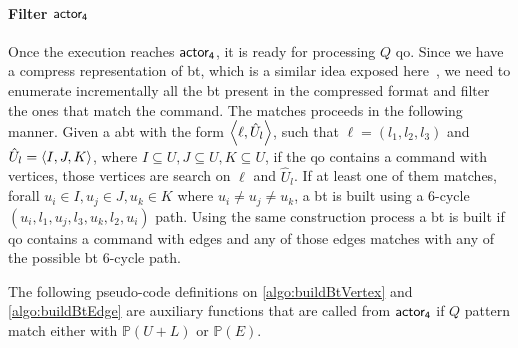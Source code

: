 \paragraph{Filter $\mathsf{actor_4}$} Once the execution reaches $\mathsf{actor_4}$, it is ready for processing $Q$ \acrlong{qo}. 
Since we have a compress representation of \acrshort{bt}, which is a similar idea exposed here~\cite{Lai}, we need to enumerate incrementally all the \acrshort{bt} present in the compressed format and filter the ones that match the command.
The matches proceeds in the following manner. Given a \acrshort{abt} with the form $\left\langle \ell, \hat{U}_l \right\rangle$, such that $\ell = (l_1,l_2,l_3)$ and $\hat{U}_l = \left\langle I,J,K \right\rangle$, where $I \subseteq U, J \subseteq U, K \subseteq U$, if the \acrshort{qo} contains a command with vertices, those vertices are search on $\ell$ and $\hat{U}_l$. 
If at least one of them matches, forall $u_i \in I, u_j \in J, u_k \in K$ where $ u_i \neq u_j \neq u_k$, a \acrshort{bt} is built using a 6-cycle $(u_i, l_1, u_j, l_3, u_k, l_2, u_i)$ path.
Using the same construction process a \acrshort{bt} is built if \acrshort{qo} contains a command with edges and any of those edges matches with any of the possible \acrshort{bt} 6-cycle path.

The following pseudo-code definitions on \autoref{algo:buildBtVertex} and \autoref{algo:buildBtEdge} are auxiliary functions that are called
from $\mathsf{actor_4}$ if $Q$ pattern match either with $\mathbb{P}(U + L)$ or $\mathbb{P}(E)$.

